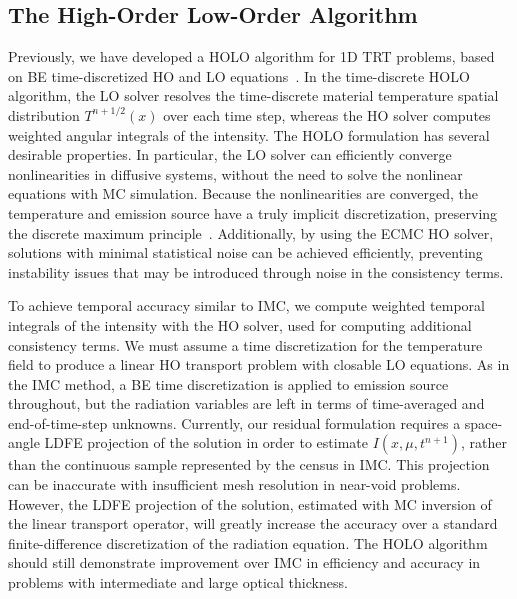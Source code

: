 \documentclass{anstrans}
\begin{document}
\subsection{The High-Order Low-Order Algorithm}

Previously, we have developed a HOLO algorithm for 1D TRT problems, based on BE time-discretized
HO and LO equations~\cite{bolding_nse}.
In the time-discrete HOLO algorithm, the LO solver resolves the time-discrete material
temperature spatial distribution $T^{n+1/2}(x)$ over each time step, whereas the HO solver computes weighted
angular integrals of the intensity.  The HOLO formulation has several desirable
properties.  In particular,  the LO solver can efficiently converge nonlinearities in diffusive
systems, without the need to solve the nonlinear equations with MC simulation.
Because the nonlinearities are converged, the temperature and emission source
have a truly implicit discretization, preserving the discrete maximum principle~\cite{morel_mpv}.
Additionally, by using the ECMC HO solver, solutions with minimal statistical noise can be achieved
efficiently, preventing instability issues that may be introduced through noise in the consistency terms.

To achieve temporal accuracy similar to IMC, we compute weighted temporal integrals of the
intensity with the HO solver, used for computing additional consistency terms.
We must assume a time discretization for the temperature field to produce a linear HO transport problem
with closable LO equations.  As in the IMC method, a BE time discretization is applied to
emission source throughout, but the radiation variables are left in terms of time-averaged and
end-of-time-step unknowns.   Currently, our residual
formulation requires a space-angle LDFE projection of the solution in order to estimate
$I(x,\mu,t^{n+1})$, rather than the continuous sample represented by the census in IMC.
This projection can be inaccurate with insufficient mesh resolution in near-void problems.
However, the LDFE projection of the solution, estimated with MC inversion of the linear transport operator,
will greatly increase the accuracy over a standard finite-difference
discretization of the radiation equation.  The HOLO algorithm should still demonstrate improvement over IMC in efficiency and
accuracy in problems with intermediate and large optical thickness. 
\end{document}
